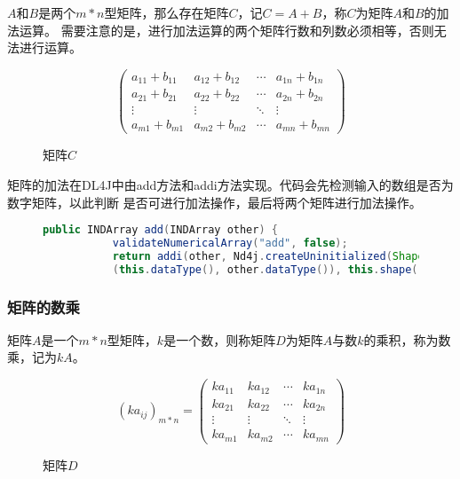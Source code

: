 $A$和$B$是两个$m*n$型矩阵，那么存在矩阵$C$，记$C=A+B$，称$C$为矩阵$A$和$B$的加法运算。
需要注意的是，进行加法运算的两个矩阵行数和列数必须相等，否则无法进行运算。

\begin{figure}[!hb]
			\begin{equation*}
				\left( \begin{matrix}
					a_{11}+b_{11} & a_{12}+b_{12} & \cdots & a_{1n}+b_{1n}\\
					a_{21}+b_{21} & a_{22}+b_{22} & \cdots & a_{2n}+b_{2n}\\
					\vdots & \vdots & \ddots & \vdots\\
					a_{m1}+b_{m1} & a_{m2}+b_{m2} & \cdots & a_{mn}+b_{mn}
					\end{matrix}
					\right )
					\end{equation*}
			\caption{矩阵$C$}
\end{figure}

矩阵的加法在DL4J中由add方法和addi方法实现。代码会先检测输入的数组是否为数字矩阵，以此判断
是否可进行加法操作，最后将两个矩阵进行加法操作。


\begin{figure}[!hb]
	\begin{lstlisting}[language=Java]
		public INDArray add(INDArray other) {
	       validateNumericalArray("add", false);
		   return addi(other, Nd4j.createUninitialized(Shape.pickPairwiseDataType
		   (this.dataType(), other.dataType()), this.shape(), this.ordering()));}
	\end{lstlisting}
\end{figure}

\subsubsection{矩阵的数乘}

矩阵$A$是一个$m*n$型矩阵，$k$是一个数，则称矩阵$D$为矩阵$A$与数$k$的乘积，称为数乘，记为$kA$。

\begin{figure}[!h]
	\begin{equation}
		(ka_{ij})_{m*n}=
		\left( \begin{matrix}
			ka_{11} & ka_{12} & \cdots & ka_{1n}\\
			ka_{21} & ka_{22} & \cdots & ka_{2n}\\
			\vdots & \vdots & \ddots & \vdots\\
			ka_{m1} & ka_{m2} & \cdots & ka_{mn}
			\end{matrix}
			\right )
	\end{equation}
	\caption{矩阵$D$}
\end{figure}

